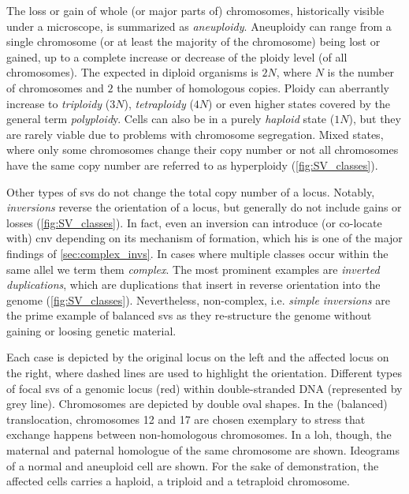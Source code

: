The loss or gain of whole (or major parts of) chromosomes, historically visible
under a microscope, is summarized as \emph{aneuploidy}.
Aneuploidy can range from a single chromosome (or at least the majority of the
chromosome) being lost or gained, up to a complete increase or decrease of the
ploidy level (of all chromosomes). The expected 
in diploid organisms is $2N$, where $N$ is the number of chromosomes and $2$ the
number of homologous copies. Ploidy can aberrantly increase to \emph{triploidy}
($3N$), \emph{tetraploidy} ($4N$) or even higher states covered by the general term
\emph{polyploid}y. Cells can also be in a purely \emph{haploid} state ($1N$),
but they are rarely viable due to problems with chromosome segregation. Mixed
states, where only some chromosomes change their copy number or not all
chromosomes have the same copy number are referred to as hyperploidy
(\cref{fig:SV_classes}).

Other types of \acp{sv} do not change the total copy number of a locus. Notably,
\emph{inversions} reverse the orientation of a locus, but generally do not
include gains or losses (\cref{fig:SV_classes}). In fact, even an inversion can
introduce (or co-locate with) \ac{cnv} depending on its mechanism of formation,
which his is one of the major findings of \cref{sec:complex_invs}.
In cases where multiple \sv classes occur within the same allel we term them
\emph{complex}. The most prominent examples are \emph{inverted duplications},
which are duplications that insert in reverse orientation into the genome
(\cref{fig:SV_classes}). Nevertheless, non-complex, i.e. \emph{simple inversions}
are the prime example of balanced \acp{sv} as they re-structure the genome
without gaining or loosing genetic material.

    {Each case is depicted by the original locus on the left and the affected
    locus on the right, where dashed lines are used to highlight the orientation.
     Different types of focal \acp{sv} of a genomic locus (red)
    within double-stranded DNA (represented by grey line).  
    Chromosomes are depicted by double oval shapes. In the (balanced)
    translocation, chromosomes 12 and 17 are chosen exemplary to stress that
    exchange happens between non-homologous chromosomes. In a \acl{loh},
    though, the maternal and paternal homologue of the same chromosome are
    shown.  Ideograms of a normal and aneuploid cell are shown.
    For the sake of demonstration, the affected cells carries a haploid,
    a triploid and a tetraploid chromosome.}

